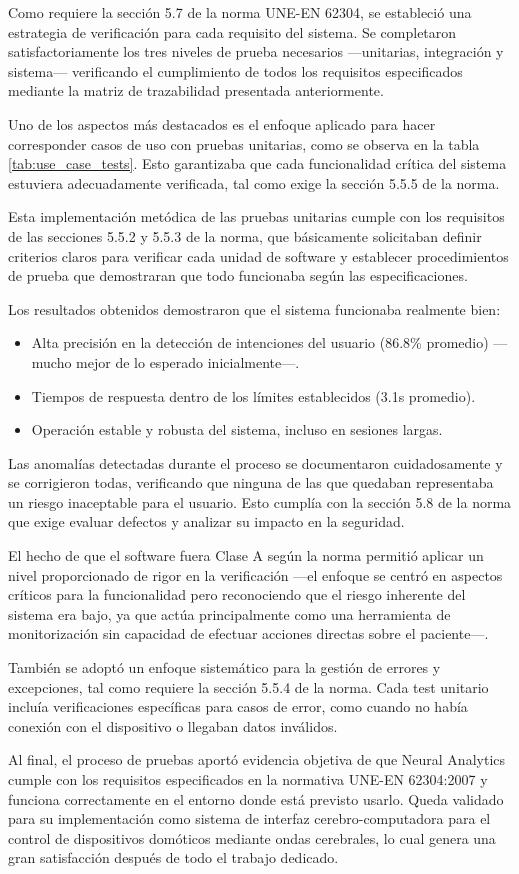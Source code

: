 Como requiere la sección 5.7 de la norma UNE-EN 62304, se estableció una estrategia de verificación para cada requisito del sistema. Se completaron satisfactoriamente los tres niveles de prueba necesarios —unitarias, integración y sistema— verificando el cumplimiento de todos los requisitos especificados mediante la matriz de trazabilidad presentada anteriormente.

Uno de los aspectos más destacados es el enfoque aplicado para hacer corresponder casos de uso con pruebas unitarias, como se observa en la tabla \ref{tab:use_case_tests}. Esto garantizaba que cada funcionalidad crítica del sistema estuviera adecuadamente verificada, tal como exige la sección 5.5.5 de la norma.

Esta implementación metódica de las pruebas unitarias cumple con los requisitos de las secciones 5.5.2 y 5.5.3 de la norma, que básicamente solicitaban definir criterios claros para verificar cada unidad de software y establecer procedimientos de prueba que demostraran que todo funcionaba según las especificaciones.

Los resultados obtenidos demostraron que el sistema funcionaba realmente bien:

\begin{itemize}
    \item Alta precisión en la detección de intenciones del usuario (86.8\% promedio) —mucho mejor de lo esperado inicialmente—.
    \item Tiempos de respuesta dentro de los límites establecidos (3.1s promedio).
    \item Operación estable y robusta del sistema, incluso en sesiones largas.
\end{itemize}

Las anomalías detectadas durante el proceso se documentaron cuidadosamente y se corrigieron todas, verificando que ninguna de las que quedaban representaba un riesgo inaceptable para el usuario. Esto cumplía con la sección 5.8 de la norma que exige evaluar defectos y analizar su impacto en la seguridad.

El hecho de que el software fuera Clase A según la norma permitió aplicar un nivel proporcionado de rigor en la verificación —el enfoque se centró en aspectos críticos para la funcionalidad pero reconociendo que el riesgo inherente del sistema era bajo, ya que actúa principalmente como una herramienta de monitorización sin capacidad de efectuar acciones directas sobre el paciente—.

También se adoptó un enfoque sistemático para la gestión de errores y excepciones, tal como requiere la sección 5.5.4 de la norma. Cada test unitario incluía verificaciones específicas para casos de error, como cuando no había conexión con el dispositivo o llegaban datos inválidos.

Al final, el proceso de pruebas aportó evidencia objetiva de que Neural Analytics cumple con los requisitos especificados en la normativa UNE-EN 62304:2007 y funciona correctamente en el entorno donde está previsto usarlo. Queda validado para su implementación como sistema de interfaz cerebro-computadora para el control de dispositivos domóticos mediante ondas cerebrales, lo cual genera una gran satisfacción después de todo el trabajo dedicado.
